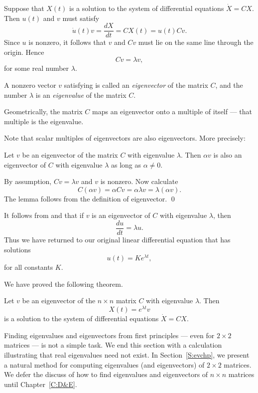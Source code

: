 Suppose that $X(t)$ is a solution to the system of differential
equations $\dot{X}=CX$.  Then $u(t)$ and $v$ must satisfy
\begin{equation}  \label{E:diffdir}
\dot{u}(t)v = \frac{dX}{dt} = CX(t) = u(t) Cv.
\end{equation}
Since $u$ is nonzero, it follows that $v$ and $Cv$ must lie on the
same line through the origin.  Hence
\begin{equation}  \label{e:eigendef}
Cv = \lambda v,
\end{equation}
for some real number $\lambda$.

\begin{Def}  \label{D:eigenvalue1}
A nonzero vector $v$ satisfying  is called an
{\em eigenvector\/}  of the matrix $C$, and
the number $\lambda$ is an {\em eigenvalue\/} 
of the matrix $C$.
\end{Def}
Geometrically, the matrix $C$ maps an eigenvector onto a multiple
of itself --- that multiple is the eigenvalue.

Note that scalar multiples of eigenvectors are also eigenvectors.  More 
precisely:
\begin{lemma}  \label{L:e'vector}
Let $v$ be an eigenvector of the matrix $C$ with eigenvalue $\lambda$.   
Then $\alpha v$ is also an eigenvector of $C$ with eigenvalue $\lambda$ 
as long as $\alpha\neq 0$.
\end{lemma}

\proof By assumption, $Cv=\lambda v$ and $v$ is nonzero. Now calculate
\[
C(\alpha v) = \alpha Cv = \alpha\lambda v = \lambda(\alpha v).
\]
The lemma follows from the definition of eigenvector.  \qed

It follows from  and  that if $v$ is
an eigenvector of $C$ with eigenvalue $\lambda$, then
\[
\frac{du}{dt} = \lambda u.
\]
Thus we have returned to our original linear differential
equation that has solutions
\[
u(t) = Ke^{\lambda t},
\]
for all constants $K$.

We have proved the following theorem.
\begin{thm}  \label{T:eigensoln}
Let $v$ be an eigenvector of the $n\times n$ matrix $C$ with
eigenvalue $\lambda$.  Then
\[
X(t) = e^{\lambda t}v
\]
is a solution to the system of differential equations $\dot{X}=CX$.
\end{thm}



Finding eigenvalues and eigenvectors from first principles --- even for 
$2\times 2$ matrices --- is not a simple task.  We end this section with 
a calculation illustrating that real eigenvalues need not exist.  In 
Section~\ref{S:evchp}, we present a natural method for computing  
eigenvalues (and eigenvectors) of $2\times2$ matrices.  We defer the 
discuss of how to find eigenvalues and eigenvectors of $n\times n$ matrices 
until Chapter~\ref{C:D&E}.


